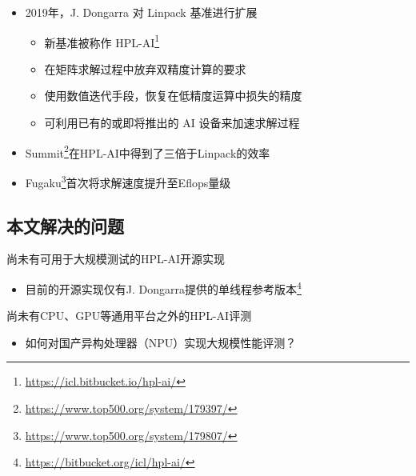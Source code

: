 \documentclass[
    fontset=fandol,
    xcolor=svgnames %
]{ctexbeamer}
\begin{document}
\begin{frame}
    \begin{itemize}
        \item 2019年，J. Dongarra 对 Linpack 基准进行扩展
              \begin{itemize}
                  \item 新基准被称作 HPL-AI\footnote{\url{https://icl.bitbucket.io/hpl-ai/}}
                  \item 在矩阵求解过程中放弃双精度计算的要求
                  \item 使用数值迭代手段，恢复在低精度运算中损失的精度
                  \item 可利用已有的或即将推出的 AI 设备来加速求解过程
              \end{itemize}
        \item Summit\footnote{\url{https://www.top500.org/system/179397/}}在HPL-AI中得到了三倍于Linpack的效率
        \item Fugaku\footnote{\url{https://www.top500.org/system/179807/}}首次将求解速度提升至Eflops量级
    \end{itemize}
\end{frame}

\subsection{本文解决的问题}

\begin{frame}
    \begin{block}{尚未有可用于大规模测试的HPL-AI开源实现}\begin{itemize}
            \item 目前的开源实现仅有J. Dongarra提供的单线程参考版本\footnote{\url{https://bitbucket.org/icl/hpl-ai/}}
        \end{itemize}
    \end{block}
    \begin{block}{尚未有CPU、GPU等通用平台之外的HPL-AI评测}\begin{itemize}
            \item 如何对国产异构处理器（NPU）实现大规模性能评测？
        \end{itemize}
    \end{block}
\end{frame}
\end{document}
